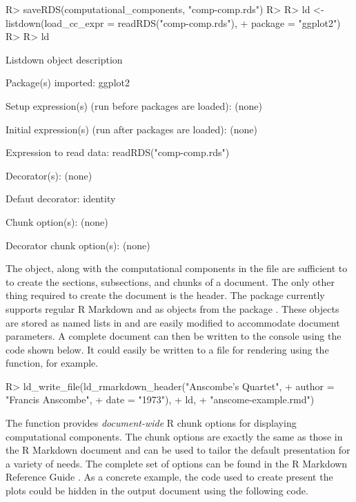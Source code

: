 \documentclass[
]{jss}
\begin{document}
\begin{CodeChunk}
\begin{CodeInput}
R> saveRDS(computational_components, "comp-comp.rds")
R> 
R> ld <- listdown(load_cc_expr = readRDS("comp-comp.rds"),
+                package = "ggplot2")
R> 
R> ld
\end{CodeInput}
\begin{CodeOutput}

Listdown object description

    Package(s) imported:
    ggplot2

    Setup expression(s) (run before packages are loaded):
    (none)

    Initial expression(s) (run after packages are loaded):
    (none)

    Expression to read data:
    readRDS("comp-comp.rds")

    Decorator(s):
    (none)

    Defaut decorator:
    identity

    Chunk option(s):
    (none)

    Decorator chunk option(s):
    (none)
\end{CodeOutput}
\end{CodeChunk}

The  object, along with the computational components in the
 file are sufficient to to create the sections,
subsections, and  chunks of a document. The only other thing
required to create the document is the header. The 
package currently supports regular R Markdown and  as
 objects from the  package \citep{yaml}. These
objects are stored as named lists in  and are easily
modified to accommodate document parameters. A complete document can
then be written to the console using the code shown below. It could
easily be written to a file for rendering using the
 function, for example.

\begin{CodeChunk}
\begin{CodeInput}
R> ld_write_file(ld_rmarkdown_header("Anscombe's Quartet",
+                                   author = "Francis Anscombe",
+                                   date = "1973"),
+               ld,
+               "anscome-example.rmd")
\end{CodeInput}
\end{CodeChunk}

The  function provides \emph{document-wide} R chunk
options for displaying computational components. The chunk options are
exactly the same as those in the R Markdown document and can be used to
tailor the default presentation for a variety of needs. The complete set
of options can be found in the R Markdown Reference Guide
\citep{rmarkdownref}. As a concrete example, the code used to create
present the plots could be hidden in the output document using the
following code.
\end{document}
